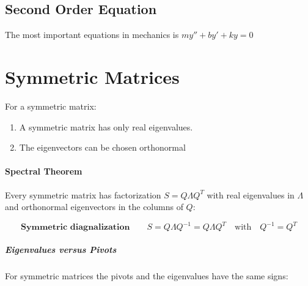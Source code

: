 \documentclass{article}
\begin{document}
\subsection{Second Order Equation}
The most important equations in mechanics is $my''+by'+ky=0$

\newpage

\section{Symmetric Matrices}


For a symmetric matrix:

\begin{enumerate}
  \item A symmetric matrix has only real eigenvalues.
  \item The eigenvectors can be chosen orthonormal
\end{enumerate}

\paragraph{Spectral Theorem}

Every symmetric matrix has factorization $S=Q\Lambda Q^T$ with real eigenvalues in $\Lambda$ and orthonormal eigenvectors in the columns of $Q$:

\[ 
  \textbf{Symmetric diagnalization} \quad \quad
  S=Q\Lambda Q^{-1}=Q\Lambda Q^{T}
  \quad  \text{with} \quad
  Q^{-1}=Q^{T}
\]

\subparagraph{Eigenvalues versus Pivots}%

For symmetric matrices the pivots and the eigenvalues have the same signs:

\end{document}
